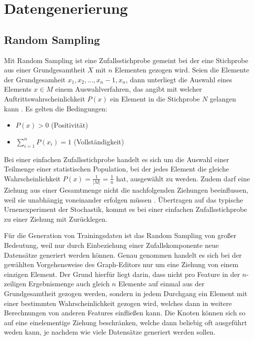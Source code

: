 
\chapter{Datengenerierung}

\section{Random Sampling}

Mit Random Sampling ist eine Zufallsstichprobe gemeint bei der eine Stichprobe aus einer Grundgesamtheit $X$ mit $n$ Elementen gezogen wird. Seien die Elemente der Grundgesamheit $x_1,x_2,\dots,x_n-1,x_n$, dann unterliegt die Auswahl eines Elements $x \in M$ einem Auswahlverfahren, das angibt mit welcher Auftrittswahrscheinlichkeit $P(x)$ ein Element in die Stichprobe $N$ gelangen kann \cite{RandomSampling}.
Es gelten die Bedingungen:
\begin{itemize}
    \item $P(x) > 0$ (Positivität)
    \item $\sum_{i=1}^{n}P(x_i)=1$ (Vollständigkeit)
\end{itemize}

Bei einer einfachen Zufallsstichprobe handelt es sich um die Auswahl einer Teilmenge einer statistischen Population, bei der jedes Element die gleiche Wahrscheinlichkeit $P(x)=\frac{1}{\lvert M \rvert}=\frac{1}{n}$ hat, ausgewählt zu werden. Zudem darf eine Ziehung aus einer Gesamtmenge nicht die nachfolgenden Ziehungen beeinflussen, weil sie unabhängig voneinander erfolgen müssen \cite{RandomSampling}. Übertragen auf das typische Urnenexperiment der Stochastik, kommt es bei einer einfachen Zufallsstichprobe zu einer Ziehung mit Zurücklegen.

Für die Generation von Trainingsdaten ist das Random Sampling von großer Bedeutung, weil nur durch Einbeziehung einer Zufallskomponente neue Datensätze generiert werden können. Genau genommen handelt es sich bei der gewählten Vorgehensweise des Graph-Editors nur um eine Ziehung von einem einzigen Element. Der Grund hierfür liegt darin, dass nicht pro Feature in der $n$-zeiligen Ergebnismenge auch gleich $n$ Elemente auf einmal aus der Grundgesamtheit gezogen werden, sondern in jedem Durchgang ein Element mit einer bestimmten Wahrscheinlichkeit gezogen wird, welches dann in weitere Berechnungen von anderen Features einfließen kann. Die Knoten können sich so auf eine einelementige Ziehung beschränken, welche dann beliebig oft ausgeführt weden kann, je nachdem wie viele Datensätze generiert werden sollen.

